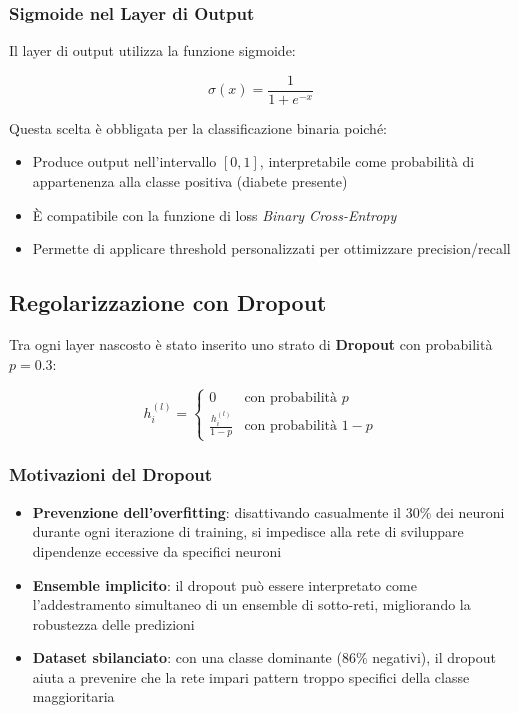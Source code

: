 \subsubsection{Sigmoide nel Layer di Output}

Il layer di output utilizza la funzione sigmoide:

\begin{equation}
    \sigma(x) = \frac{1}{1 + e^{-x}}
\end{equation}

Questa scelta è obbligata per la classificazione binaria poiché:
\begin{itemize}
    \item Produce output nell'intervallo $[0, 1]$, interpretabile come probabilità di appartenenza alla classe positiva (diabete presente)
    \item È compatibile con la funzione di loss \textit{Binary Cross-Entropy}
    \item Permette di applicare threshold personalizzati per ottimizzare precision/recall
\end{itemize}

\subsection{Regolarizzazione con Dropout}

Tra ogni layer nascosto è stato inserito uno strato di \textbf{Dropout} con probabilità $p = 0.3$:

\begin{equation}
    h_i^{(l)} = \begin{cases}
        0 & \text{con probabilità } p \\
        \frac{h_i^{(l)}}{1-p} & \text{con probabilità } 1-p
    \end{cases}
\end{equation}

\subsubsection{Motivazioni del Dropout}

\begin{itemize}
    \item \textbf{Prevenzione dell'overfitting}: disattivando casualmente il 30\% dei neuroni durante ogni iterazione di training, si impedisce alla rete di sviluppare dipendenze eccessive da specifici neuroni
    \item \textbf{Ensemble implicito}: il dropout può essere interpretato come l'addestramento simultaneo di un ensemble di sotto-reti, migliorando la robustezza delle predizioni
    \item \textbf{Dataset sbilanciato}: con una classe dominante (86\% negativi), il dropout aiuta a prevenire che la rete impari pattern troppo specifici della classe maggioritaria
\end{itemize}

